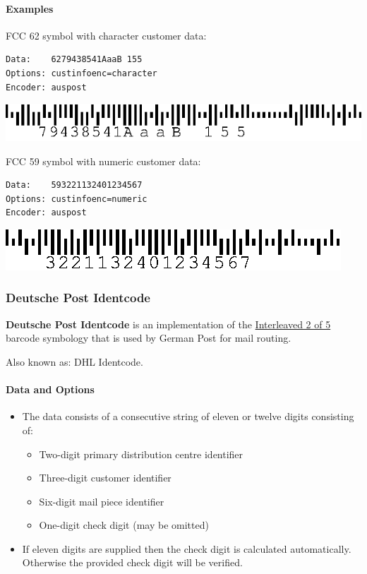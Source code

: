 \hypertarget{examples-32}{%
\paragraph{Examples}\label{examples-32}}

FCC 62 symbol with character customer data:

\begin{verbatim}
Data:    6279438541AaaB 155
Options: custinfoenc=character
Encoder: auspost
\end{verbatim}

\includegraphics{images/auspost-1.eps}

FCC 59 symbol with numeric customer data:

\begin{verbatim}
Data:    593221132401234567
Options: custinfoenc=numeric
Encoder: auspost
\end{verbatim}

\includegraphics{images/auspost-2.eps}

\hypertarget{deutsche-post-identcode}{%
\subsubsection{Deutsche Post Identcode}\label{deutsche-post-identcode}}

\textbf{Deutsche Post Identcode} is an implementation of the
\protect\hyperlink{interleaved-2-of-5}{Interleaved 2 of 5} barcode
symbology that is used by German Post for mail routing.

Also known as: DHL Identcode.

\hypertarget{data-and-options-43}{%
\paragraph{Data and Options}\label{data-and-options-43}}

\begin{itemize}
\tightlist
\item
  The data consists of a consecutive string of eleven or twelve digits
  consisting of:

  \begin{itemize}
  \tightlist
  \item
    Two-digit primary distribution centre identifier
  \item
    Three-digit customer identifier
  \item
    Six-digit mail piece identifier
  \item
    One-digit check digit (may be omitted)
  \end{itemize}
\item
  If eleven digits are supplied then the check digit is calculated
  automatically. Otherwise the provided check digit will be verified.
\end{itemize}

